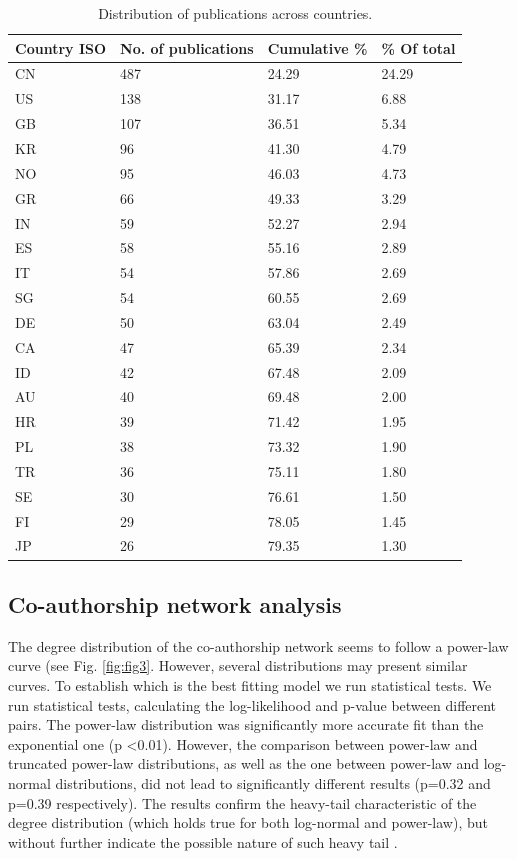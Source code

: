 \documentclass[a4paper, review, endfloat, doubleblind, authoryear]{elsarticle}
\begin{document}
	\begin{table}[h]
		\centering
		\caption{Distribution of publications across countries.}
		\begin{tabularx}{\linewidth}{XXXX}
			\hline
			Country ISO & No. of publications & Cumulative \% & \% Of total \\
			\hline
			CN & 487 & 24.29 & 24.29\\
			US & 138 & 31.17 & 6.88\\
			GB & 107 & 36.51 & 5.34\\
			KR & 96 & 41.30 & 4.79\\
			NO & 95 & 46.03 & 4.73\\
			GR & 66 & 49.33 & 3.29\\
			IN & 59 & 52.27 & 2.94\\
			ES & 58 & 55.16 & 2.89\\
			IT & 54 & 57.86 & 2.69\\
			SG & 54 & 60.55 & 2.69\\
			DE & 50 & 63.04 & 2.49\\
			CA & 47 & 65.39 & 2.34\\
			ID & 42 & 67.48 & 2.09\\
			AU & 40 & 69.48 & 2.00\\
			HR & 39 & 71.42 & 1.95\\
			PL & 38 & 73.32 & 1.90\\
			TR & 36 & 75.11 & 1.80\\
			SE & 30 & 76.61 & 1.50\\
			FI & 29 & 78.05 & 1.45\\
			JP & 26 & 79.35 & 1.30\\
			\hline
		\end{tabularx}
		\label{tab:resdesccountry}
	\end{table}

	\subsection{Co-authorship network analysis}
	The degree distribution of the co-authorship network seems to follow a power-law curve (see Fig. \ref{fig:fig3}. However, several distributions may present similar curves. To establish which is the best fitting model we run statistical tests. We run statistical tests, calculating the log-likelihood and p-value between different pairs. The power-law distribution was significantly more accurate fit than the exponential one (p \textless 0.01). However, the comparison between power-law and truncated power-law distributions, as well as the one between power-law and log-normal distributions, did not lead to significantly different results (p=0.32 and p=0.39 respectively). The results confirm the heavy-tail characteristic of the degree distribution (which holds true for both log-normal and power-law), but without further indicate the possible nature of such heavy tail \citep{mitzenmacher2004brief,higaki2020co,liu2021structural,smith2021explaining}.
	
\end{document}

